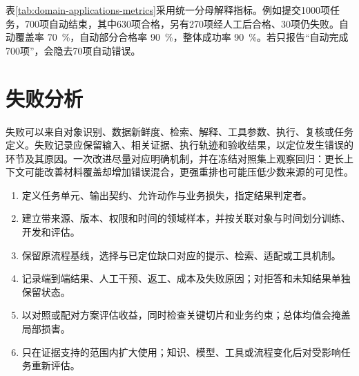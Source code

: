 \documentclass[../textbook.tex]{subfiles}
\begin{document}
表\ref{tab:domain-applications-metrics}采用统一分母解释指标。例如提交1000项任务，700项自动结束，其中630项合格，另有270项经人工后合格、30项仍失败。自动覆盖率 \qty{70}{\percent}，自动部分合格率 \qty{90}{\percent}，整体成功率 \qty{90}{\percent}。若只报告“自动完成700项”，会隐去70项自动错误。

\section{失败分析}

失败可以来自对象识别、数据新鲜度、检索、解释、工具参数、执行、复核或任务定义。失败记录应保留输入、相关证据、执行轨迹和验收结果，以定位发生错误的环节及其原因。一次改进尽量对应明确机制，并在冻结对照集上观察回归：更长上下文可能改善材料覆盖却增加错误混合，更强重排也可能压低少数来源的可见性。

\begin{algorithm}[领域应用的评估与迭代流程]

\begin{enumerate}
\item 定义任务单元、输出契约、允许动作与业务损失，指定结果判定者。
\item 建立带来源、版本、权限和时间的领域样本，并按关联对象与时间划分训练、开发和评估。
\item 保留原流程基线，选择与已定位缺口对应的提示、检索、适配或工具机制。
\item 记录端到端结果、人工干预、返工、成本及失败原因；对拒答和未知结果单独保留状态。
\item 以对照或配对方案评估收益，同时检查关键切片和业务约束；总体均值会掩盖局部损害。
\item 只在证据支持的范围内扩大使用；知识、模型、工具或流程变化后对受影响任务重新评估。
\end{enumerate}
\end{algorithm}




\chapterreferences
\myendchapterdocument
\end{document}
